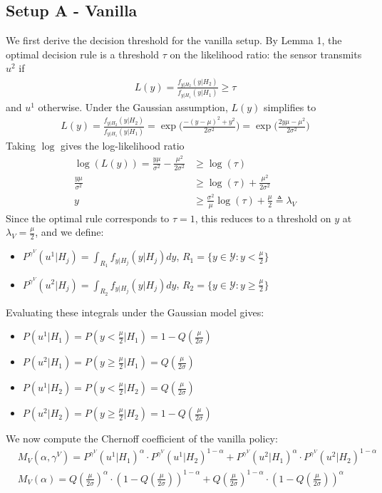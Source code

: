 \documentclass[11pt]{article}
\begin{document}
\subsection*{Setup A - Vanilla}
We first derive the decision threshold for the vanilla setup. By Lemma 1, the optimal decision rule is a threshold $\tau$ on the likelihood ratio: the sensor transmits $u^2$ if
\begin{align*}
    L(y) = \frac{f_{y|H_2}(y|H_2)}{f_{y|H_1}(y|H_1)} \geq \tau
\end{align*}
and $u^1$ otherwise. Under the Gaussian assumption, $L(y)$ simplifies to
\begin{align*}
    L(y) = \frac{f_{y|H_2}(y|H_2)}{f_{y|H_1}(y|H_1)} = \exp\bigg(\frac{-(y-\mu)^2 + y^2}{2\sigma^2}\bigg) = \exp\bigg(\frac{2y\mu-\mu^2}{2\sigma^2}\bigg)
\end{align*}
Taking $\log$ gives the log-likelihood ratio
\begin{align*}
    \log(L(y)) = \frac{y\mu}{\sigma^2} - \frac{\mu^2}{2\sigma^2} &\geq \log(\tau) \\
    \frac{y\mu}{\sigma^2} &\geq \log(\tau) + \frac{\mu^2}{2\sigma^2}\\
    y &\geq \frac{\sigma^2}{\mu}\log(\tau) + \frac{\mu}{2} \triangleq \lambda_V
\end{align*}
Since the optimal rule corresponds to $\tau = 1$, this reduces to a threshold on $y$ at $\lambda_V = \frac{\mu}{2}$, and we define:
\begin{itemize}
    \item $P^{\gamma^V}(u^1|H_j) = \int_{R_1}f_{y|H_j}(y|H_j)dy$, $R_1 = \{y \in \mathcal{Y}: y < \frac{\mu}{2}\}$
    \item $P^{\gamma^V}(u^2|H_j) = \int_{R_2}f_{y|H_j}(y|H_j)dy$, $R_2 = \{y \in \mathcal{Y}: y \geq \frac{\mu}{2}\}$
\end{itemize}
Evaluating these integrals under the Gaussian model gives:
\begin{itemize}
    \item $P(u^1|H_1) = P(y<\frac{\mu}{2}|H_1) = 1-Q(\frac{\mu}{2\sigma})$
    \item $P(u^2|H_1) = P(y\geq\frac{\mu}{2}|H_1) = Q(\frac{\mu}{2\sigma})$
    \item $P(u^1|H_2) = P(y<\frac{\mu}{2}|H_2) = Q(\frac{\mu}{2\sigma})$
    \item $P(u^2|H_2) = P(y\geq\frac{\mu}{2}|H_2) = 1-Q(\frac{\mu}{2\sigma})$
\end{itemize}
We now compute the Chernoff coefficient of the vanilla policy:
\begin{align}
    &M_{V}(\alpha,\gamma^V) = P^{\gamma^V}(u^1|H_1)^\alpha \cdot P^{\gamma^V}(u^1|H_2)^{1-\alpha} + P^{\gamma^V}(u^2|H_1)^\alpha \cdot P^{\gamma^V}(u^2|H_2)^{1-\alpha}\\
    &M_{V}(\alpha) = Q(\frac{\mu}{2\sigma})^{\alpha} \cdot (1-Q(\frac{\mu}{2\sigma}))^{1-\alpha} + Q(\frac{\mu}{2\sigma})^{1-\alpha} \cdot (1-Q(\frac{\mu}{2\sigma}))^{\alpha}
\end{align}
\end{document}
